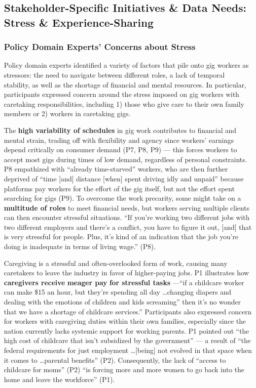 {\subsection{Stakeholder-Specific Initiatives \& Data Needs: Stress \& Experience-Sharing} \label{specific}} 

\subsubsection{{Policy Domain Experts' Concerns about} Stress}\label{stress}
{Policy domain experts} identified a variety of factors that pile onto gig workers as stressors: the need to navigate between different roles, a lack of temporal stability, as well as the shortage of financial and mental resources. In particular, participants expressed concern around the stress imposed on gig workers with caretaking responsibilities, including 1) those who give care to their own family members or 2) workers in caretaking gigs.

The \textbf{high variability of schedules} in gig work contributes to financial and mental strain{, trading off with flexibility and} agency since workers' earnings depend critically on consumer demand (P7, P8, P9) {--- this forces} workers to accept most gigs during times of low demand, regardless of personal constraints. P8 empathized with ``already time-starved'' workers, who are then further deprived of ``time [and] distance [when] spent driving idly and unpaid'' because platforms pay workers for the effort of the gig itself, but not the effort spent searching for gigs (P9). 
To overcome the work precarity, some might take on a \textbf{multitude of roles} to meet financial needs{, but workers} serving multiple clients {can then encounter} stressful situations. ``If you're working two different jobs with two different employers and there's a conflict, you have to figure it out, [and] that is very stressful for people. Plus, it's kind of an indication that the job you're doing is inadequate in terms of living wage.'' (P8).

Caregiving is a stressful and often-overlooked form of work, causing many caretakers to leave the industry in favor of higher-paying jobs. P1 illustrates {how \textbf{caregivers receive}} \textbf{meager pay} \textbf{for stressful tasks} ---``if a childcare worker can make \$15 an hour, but they're spending all day \dots changing diapers and dealing with the emotions of children and kids screaming'' then it's no wonder that we have a shortage of childcare services.'' Participants also expressed concern for workers with caregiving duties within their own families, especially since the nation currently lacks systemic support for working parents. P1 pointed out ``the high cost of childcare that isn't subsidized by the government'' --- a result of ``the federal requirements for just employment  \dots  [being] not evolved in that space when it comes to \dots parental benefits'' (P2). Consequently, the lack of ``access to childcare for moms'' (P2) ``is forcing more and more women to go back into the home and leave the workforce'' (P1).

